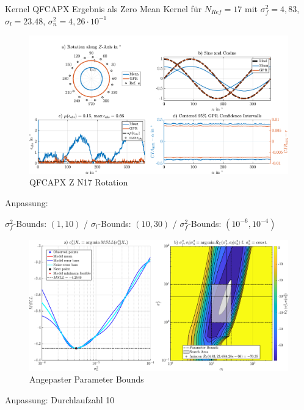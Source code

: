 Kernel QFCAPX Ergebnis als Zero Mean Kernel für $N_{Ref} = 17$ mit $\sigma_f^2 = 4,83$, $\sigma_l = 23.48$, $\sigma_n^2 = 4,26\cdot10^{-1}$


\begin{figure}[tbph]
	\centering
	\includegraphics[width=\linewidth]{appendix/images/8-Ergebnisse-Experimente/QFCAPX-Z-N17-Rotation}
	\caption[QFCAPX Z N17 Rotation]{QFCAPX Z N17 Rotation}
	\label{fig:qfcapx-z-n17-rotation}
\end{figure}


Anpassung:

$\sigma_f^2$-Bounds: $(1, 10)$ / $\sigma_l$-Bounds: $(10, 30)$ / $\sigma_f^2$-Bounds: $(10^{-6}, 10^{-4})$


\begin{figure}
	\centering
	\includegraphics[width=\linewidth]{appendix/images/8-Ergebnisse-Experimente/QFCAPX-Z-N17-Bounds}
	\caption[Angepaster Parameter Bounds]{Angepaster Parameter Bounds}
	\label{fig:qfcapx-z-n17-bounds}
\end{figure}


Anpassung: Durchlaufzahl 10


